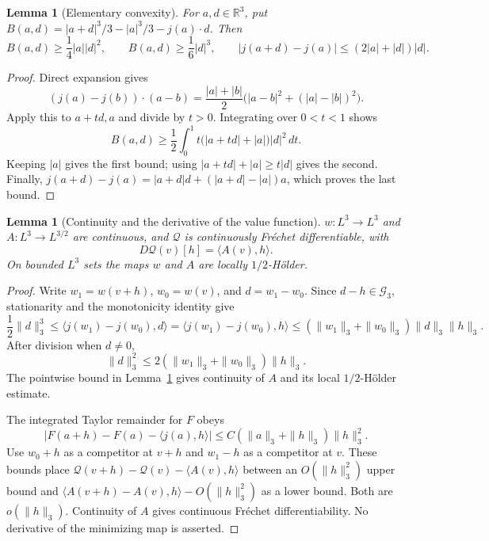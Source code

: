 \documentclass[11pt,a4paper]{article}
\newtheorem{lemma}[theorem]{Lemma}
\theoremstyle{definition}
\newcommand{\R}{\mathbb R}
\newcommand{\G}{\mathcal G_3}
\newcommand{\Q}{\mathcal Q}
\newcommand{\ip}[2]{\langle #1,#2\rangle}
\begin{document}
\begin{lemma}[Elementary convexity]\label{lem:convex}
For $a,d\in\R^3$, put $B(a,d)=|a+d|^3/3-|a|^3/3-j(a)\cdot d$. Then
\begin{equation}\label{eq:convex}
 B(a,d)\ge\frac14|a||d|^2,\qquad
 B(a,d)\ge\frac16|d|^3,\qquad
 |j(a+d)-j(a)|\le(2|a|+|d|)|d|.
\end{equation}
\end{lemma}
\begin{proof}
Direct expansion gives
\[
 (j(a)-j(b))\cdot(a-b)
 =\frac{|a|+|b|}{2}\bigl(|a-b|^2+(|a|-|b|)^2\bigr).
\]
Apply this to $a+td,a$ and divide by $t>0$. Integrating over $0<t<1$ shows
\[
 B(a,d)\ge\frac12\int_0^1t\bigl(|a+td|+|a|\bigr)|d|^2\,dt.
\]
Keeping $|a|$ gives the first bound; using $|a+td|+|a|\ge t|d|$ gives the second. Finally,
$j(a+d)-j(a)=|a+d|d+(|a+d|-|a|)a$, which proves the last bound.
\end{proof}

\begin{lemma}[Continuity and the derivative of the value function]\label{lem:derivative}
$w:L^3\to L^3$ and $A:L^3\to L^{3/2}$ are continuous, and $\Q$ is continuously Fr\'echet differentiable, with
\begin{equation}\label{eq:derivative}
 D\Q(v)[h]=\ip{A(v)}{h}.
\end{equation}
On bounded $L^3$ sets the maps $w$ and $A$ are locally $1/2$-H\"older.
\end{lemma}
\begin{proof}
Write $w_1=w(v+h)$, $w_0=w(v)$, and $d=w_1-w_0$. Since $d-h\in\G$, stationarity and the monotonicity identity give
\[
 \frac12\|d\|_3^3
 \le\ip{j(w_1)-j(w_0)}{d}
 =\ip{j(w_1)-j(w_0)}{h}
 \le(\|w_1\|_3+\|w_0\|_3)\|d\|_3\|h\|_3.
\]
After division when $d\ne0$,
\begin{equation}\label{eq:holderw}
 \|d\|_3^2\le2(\|w_1\|_3+\|w_0\|_3)\|h\|_3.
\end{equation}
The pointwise bound in Lemma~\ref{lem:convex} gives continuity of $A$ and its local $1/2$-H\"older estimate.

The integrated Taylor remainder for $F$ obeys
\[
 |F(a+h)-F(a)-\ip{j(a)}h|
 \le C(\|a\|_3+\|h\|_3)\|h\|_3^2.
\]
Use $w_0+h$ as a competitor at $v+h$ and $w_1-h$ as a competitor at $v$. These bounds place $\Q(v+h)-\Q(v)-\ip{A(v)}h$ between an $O(\|h\|_3^2)$ upper bound and
$\ip{A(v+h)-A(v)}h-O(\|h\|_3^2)$ as a lower bound. Both are $o(\|h\|_3)$. Continuity of $A$ gives continuous Fr\'echet differentiability. No derivative of the minimizing map is asserted.
\end{proof}
\end{document}
